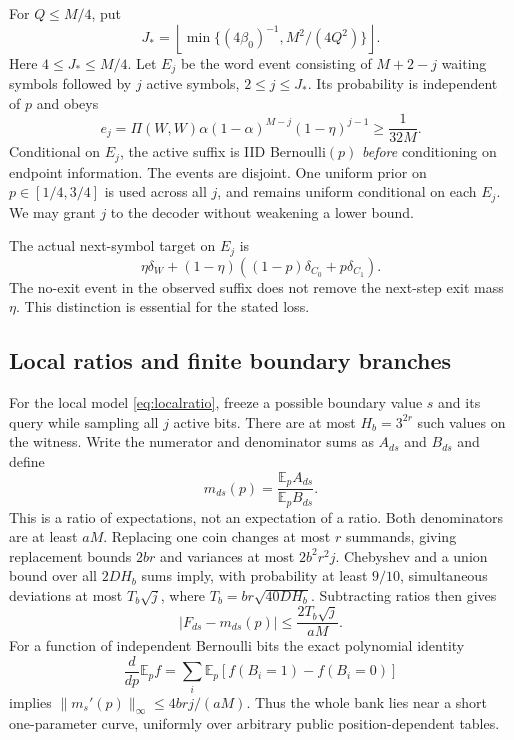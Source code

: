 \documentclass[11pt,letterpaper]{article}
\theoremstyle{definition}\newtheorem{definition}[theorem]{Definition}
\theoremstyle{remark}\newtheorem{remark}[theorem]{Remark}
\newcommand{\E}{\mathbb{E}}
\newcommand{\floor}[1]{\left\lfloor #1\right\rfloor}
\newcommand{\betaz}{\beta_0}
\begin{document}
For $Q\le M/4$, put
\begin{equation}\label{eq:jcut}
 J_* =\floor{\min\{(4\betaz)^{-1},M^2/(4Q^2)\}}.
\end{equation}
Here $4\le J_*\le M/4$. Let $E_j$ be the word event consisting of $M+2-j$ waiting symbols followed by $j$ active symbols, $2\le j\le J_*$. Its probability is independent of $p$ and obeys
\begin{equation}\label{eq:eventmass}
 e_j=\Pi(W,W)\alpha(1-\alpha)^{M-j}(1-\eta)^{j-1}\ge\frac1{32M}.
\end{equation}
Conditional on $E_j$, the active suffix is IID Bernoulli$(p)$ \emph{before} conditioning on endpoint information. The events are disjoint. One uniform prior on $p\in[1/4,3/4]$ is used across all $j$, and remains uniform conditional on each $E_j$. We may grant $j$ to the decoder without weakening a lower bound.

The actual next-symbol target on $E_j$ is
\begin{equation}\label{eq:target}
 \eta\delta_W+(1-\eta)((1-p)\delta_{C_0}+p\delta_{C_1}).
\end{equation}
The no-exit event in the observed suffix does not remove the next-step exit mass $\eta$. This distinction is essential for the stated loss.

\subsection{Local ratios and finite boundary branches}
For the local model \eqref{eq:localratio}, freeze a possible boundary value $s$ and its query while sampling all $j$ active bits. There are at most $H_b=3^{2r}$ such values on the witness. Write the numerator and denominator sums as $A_{ds}$ and $B_{ds}$ and define
\[
 m_{ds}(p)=\frac{\E_p A_{ds}}{\E_p B_{ds}}.
\]
This is a ratio of expectations, not an expectation of a ratio. Both denominators are at least $aM$. Replacing one coin changes at most $r$ summands, giving replacement bounds $2br$ and variances at most $2b^2r^2j$. Chebyshev and a union bound over all $2DH_b$ sums imply, with probability at least $9/10$, simultaneous deviations at most $T_b\sqrt j$, where $T_b=br\sqrt{40DH_b}$. Subtracting ratios then gives
\begin{equation}\label{eq:localtube}
 |F_{ds}-m_{ds}(p)|\le\frac{2T_b\sqrt j}{aM}.
\end{equation}
For a function of independent Bernoulli bits the exact polynomial identity
\begin{equation}\label{eq:derivative}
 \frac{d}{dp}\E_pf=\sum_i\E_p[f(B_i=1)-f(B_i=0)]
\end{equation}
implies $\|m_s'(p)\|_\infty\le4brj/(aM)$. Thus the whole bank lies near a short one-parameter curve, uniformly over arbitrary public position-dependent tables.
\end{document}
